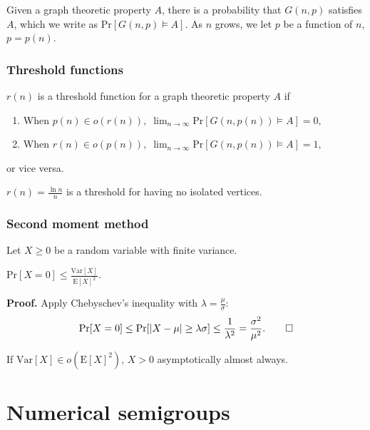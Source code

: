 \documentclass{beamer}
\def\Pr{\ensuremath{\mathrm{Pr}}}
\def\Var{\ensuremath{\mathrm{Var}}}
\def\EE{\ensuremath{\mathrm{E}}}
\begin{document}

\begin{frame}
    Given a graph theoretic property $A$, there is a probability that $G(n, p)$ satisfies $A$, which we write as $\Pr[G(n, p) \vDash A]$. As $n$ grows, we let $p$ be a function of $n$, $p = p(n)$. \par
\frametitle{Threshold functions}
\begin{definition}\label{def:probmet:threshold}
    $r(n)$ is a threshold function for a graph theoretic property $A$ if 
    \begin{enumerate}
        \item When \(p(n) \in o(r(n)), \; \lim_{n \to \infty} \Pr[G(n, p(n)) \vDash A] = 0,\)
        \item When \(r(n) \in o(p(n)), \;  \lim_{n \to \infty} \Pr[G(n, p(n)) \vDash A] = 1,\) 
    \end{enumerate}
    or vice versa.
\end{definition}
\begin{example}
    $\displaystyle{r(n) = \frac{\ln n}{n}}$ is a threshold for having no isolated vertices. 
\end{example}
\end{frame}



\begin{frame}
    \frametitle{Second moment method}
    Let $X \geq 0$ be a random variable with finite variance. 
    \begin{theorem}\label{thm:probmet:secondmoment:1}
        \(\Pr[X = 0] \leq \frac{\Var[X]}{\EE[X]^2}.\)
    \end{theorem}
    \textbf{Proof.} Apply Chebyschev's inequality with $\lambda = \frac{\mu}{\sigma}$:
    \[\Pr[X = 0] \leq \Pr[|X - \mu| \geq \lambda \sigma] \leq \frac{1}{\lambda^2} = \frac{\sigma^2}{\mu^2}. \qed \]
    \begin{corollary}\label{cor:probmet:secondmoment:1}
        If $\Var[X] \in o(\EE[X]^2)$, $X > 0$ asymptotically almost always. 
    \end{corollary}
    
\end{frame}


\section{Numerical semigroups}
\end{document}
